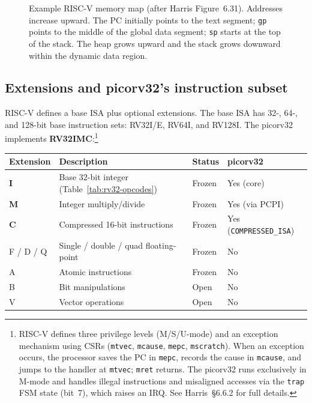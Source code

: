 \documentclass[9pt, a4paper]{extarticle}
\begin{document}
\begin{figure}[htbp]
    \caption{Example RISC-V memory map (after Harris Figure~6.31). Addresses increase upward. The PC initially points to the text segment; \texttt{gp} points to the middle of the global data segment; \texttt{sp} starts at the top of the stack. The heap grows upward and the stack grows downward within the dynamic data region.}
    \label{fig:memmap}
\end{figure}

\subsection{Extensions and picorv32's instruction subset}

RISC-V defines a base ISA plus optional extensions. The base ISA has 32-, 64-, and 128-bit base
instruction sets: RV32I/E, RV64I, and RV128I. The picorv32 implements \textbf{RV32IMC}:\footnote{RISC-V defines three privilege levels (M/S/U-mode) and an exception mechanism using CSRs (\texttt{mtvec}, \texttt{mcause}, \texttt{mepc}, \texttt{mscratch}). When an exception occurs, the processor saves the PC in \texttt{mepc}, records the cause in \texttt{mcause}, and jumps to the handler at \texttt{mtvec}; \texttt{mret} returns. The picorv32 runs exclusively in M-mode and handles illegal instructions and misaligned accesses via the \texttt{trap} FSM state (bit~7), which raises an IRQ. See Harris~\S6.6.2 for full details.}

\begin{center}\small
\begin{tabular}{@{}l l l l@{}}
    \toprule
    Extension & Description & Status & picorv32 \\
    \midrule
    \textbf{I} & Base 32-bit integer (Table~\ref{tab:rv32-opcodes}) & Frozen & Yes (core) \\
    \textbf{M} & Integer multiply/divide & Frozen & Yes (via PCPI) \\
    \textbf{C} & Compressed 16-bit instructions & Frozen & Yes (\texttt{COMPRESSED\_ISA}) \\
    F / D / Q & Single / double / quad floating-point & Frozen & No \\
    A & Atomic instructions & Frozen & No \\
    B & Bit manipulations & Open & No \\
    V & Vector operations & Open & No \\
    \bottomrule
\end{tabular}
\end{center}
\end{document}

